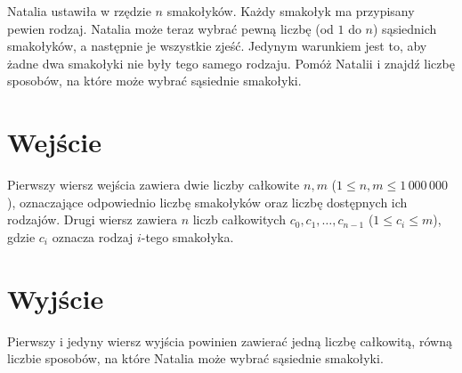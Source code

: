 \documentclass{spiral-kurs}
\begin{document}
\makeheader
%
    Natalia ustawiła w rzędzie $n$ smakołyków. Każdy smakołyk ma przypisany pewien rodzaj.
    Natalia może teraz wybrać pewną liczbę (od $1$ do $n$) sąsiednich smakołyków, a następnie je wszystkie zjeść.
    Jedynym warunkiem jest to, aby żadne dwa smakołyki nie były tego samego rodzaju.
    Pomóż Natalii i znajdź liczbę sposobów, na które może wybrać sąsiednie smakołyki.

    \section{Wejście}
    Pierwszy wiersz wejścia zawiera dwie liczby całkowite $n, m$ ($1 \leq n, m \leq 1\,000\,000$),
    oznaczające odpowiednio liczbę smakołyków oraz liczbę dostępnych ich rodzajów.
    Drugi wiersz zawiera $n$ liczb całkowitych $c_0, c_1, \ldots, c_{n-1}$ ($1 \leq c_i \leq m$),
    gdzie $c_i$ oznacza rodzaj $i$-tego smakołyka.

    \section{Wyjście}
    Pierwszy i jedyny wiersz wyjścia powinien zawierać jedną liczbę całkowitą,
    równą liczbie sposobów, na które Natalia może wybrać sąsiednie smakołyki.


  
\end{document}
